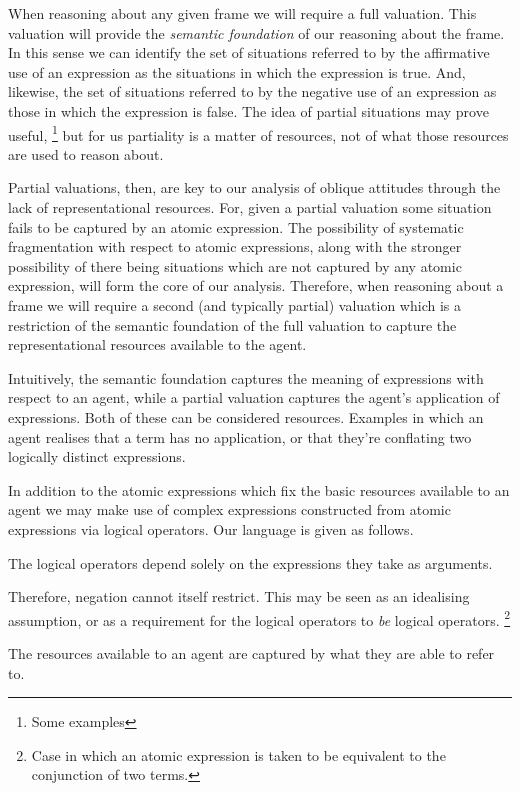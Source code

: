 \documentclass[10pt]{article}
\begin{document}
When reasoning about any given frame we will require a full valuation.
This valuation will provide the \emph{semantic foundation} of our reasoning about the frame.
In this sense we can identify the set of situations referred to by the affirmative use of an expression as the situations in which the expression is true.
And, likewise, the set of situations referred to by the negative use of an expression as those in which the expression is false.
The idea of partial situations may prove useful,\nolinebreak
\footnote{Some examples}
but for us partiality is a matter of resources, not of what those resources are used to reason about.

Partial valuations, then, are key to our analysis of oblique attitudes through the lack of representational resources.
For, given a partial valuation some situation fails to be captured by an atomic expression.
The possibility of systematic fragmentation with respect to atomic expressions, along with the stronger possibility of there being situations which are not captured by any atomic expression, will form the core of our analysis.
Therefore, when reasoning about a frame we will require a second (and typically partial) valuation which is a restriction of the semantic foundation of the full valuation to capture the representational resources available to the agent.

Intuitively, the semantic foundation captures the meaning of expressions with respect to an agent, while a partial valuation captures the agent's application of expressions.
Both of these can be considered resources.
Examples in which an agent realises that a term has no application, or that they're conflating two logically distinct expressions.




In addition to the atomic expressions which fix the basic resources available to an agent we may make use of complex expressions constructed from atomic expressions via logical operators.
Our language is given as follows.

The logical operators depend solely on the expressions they take as arguments.



Therefore, negation cannot itself restrict.
This may be seen as an idealising assumption, or as a requirement for the logical operators to \emph{be} logical operators.\nolinebreak
\footnote{Case in which an atomic expression is taken to be equivalent to the conjunction of two terms.}

The resources available to an agent are captured by what they are able to refer to.
\end{document}
